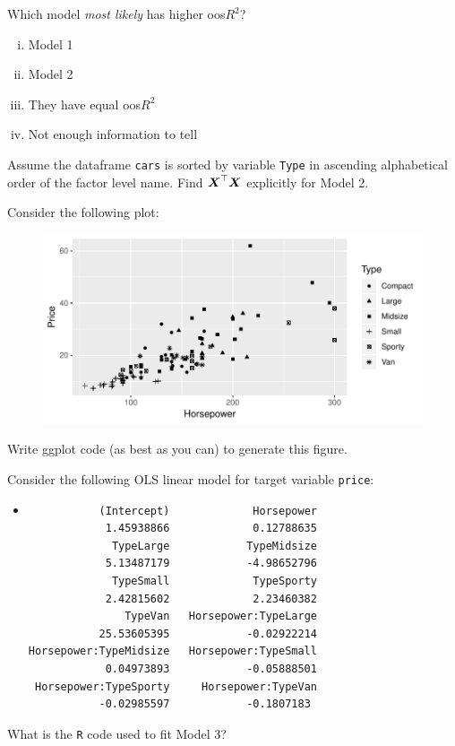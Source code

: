 \documentclass[12pt]{article}
\begin{document}
 Which model \emph{most likely} has higher oos$R^2$?

\begin{enumerate}[i)]
\item Model 1
\item Model 2
\item They have equal oos$R^2$
\item Not enough information to tell
\end{enumerate}


 Assume the dataframe \texttt{cars} is sorted by variable \texttt{Type} in ascending alphabetical order of the factor level name. Find $\boldsymbol{X}^\top \boldsymbol{X}$ explicitly for Model 2.

Consider the following plot:

\begin{figure}[htp]
\centering
\includegraphics[width=6in]{price_vs_horsepower_by_type}
\end{figure}

 Write ggplot code (as best as you can) to generate this figure.  

Consider the following OLS linear model for target variable \texttt{price}:

\begin{itemize}
\item[\fbox{Model 3}]

\begin{verbatim}
           (Intercept)             Horsepower 
            1.45938866             0.12788635 
             TypeLarge            TypeMidsize 
            5.13487179            -4.98652796 
             TypeSmall             TypeSporty 
            2.42815602             2.23460382 
               TypeVan   Horsepower:TypeLarge 
           25.53605395            -0.02922214 
Horsepower:TypeMidsize   Horsepower:TypeSmall 
            0.04973893            -0.05888501 
 Horsepower:TypeSporty     Horsepower:TypeVan 
           -0.02985597            -0.1807183
\end{verbatim}
\end{itemize}
 What is the \texttt{R} code used to fit Model 3?
\end{document}
